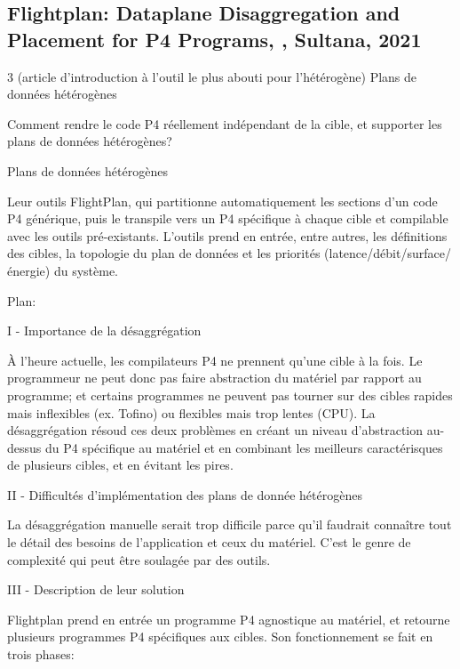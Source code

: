 
\subsection{Flightplan: Dataplane Disaggregation and Placement for P4 Programs, \cite{sultana_flightplan_2021}, Sultana, 2021}
 3 (article d'introduction à l'outil le plus abouti pour l'hétérogène)
 Plans de données hétérogènes

 Comment rendre le code P4 réellement indépendant de la cible, et supporter les plans de données hétérogènes?

 Plans de données hétérogènes \cite{santiago_da_silva_one_2018}

 Leur outils FlightPlan, qui partitionne automatiquement les sections d'un code P4 générique, puis le transpile vers un P4 spécifique à chaque cible et compilable avec les outils pré-existants. L'outils prend en entrée, entre autres, les définitions des cibles, la topologie du plan de données et les priorités (latence/débit/surface/énergie) du système.


Plan:

I - Importance de la désaggrégation

À l'heure actuelle, les compilateurs P4 ne prennent qu'une cible à la fois. Le programmeur ne peut donc pas faire abstraction du matériel par rapport au programme; et certains programmes ne peuvent pas tourner sur des cibles rapides mais inflexibles (ex. Tofino) ou flexibles mais trop lentes (CPU). La désaggrégation résoud ces deux problèmes en créant un niveau d'abstraction au-dessus du P4 spécifique au matériel et en combinant les meilleurs caractérisques de plusieurs cibles, et en évitant les pires.

II - Difficultés d'implémentation des plans de donnée hétérogènes

La désaggrégation manuelle serait trop difficile parce qu'il faudrait connaître tout le détail des besoins de l'application et ceux du matériel. C'est le genre de complexité qui peut être soulagée par des outils.

III - Description de leur solution

Flightplan prend en entrée un programme P4 agnostique au matériel, et retourne plusieurs programmes P4 spécifiques aux cibles. Son fonctionnement se fait en trois phases:

